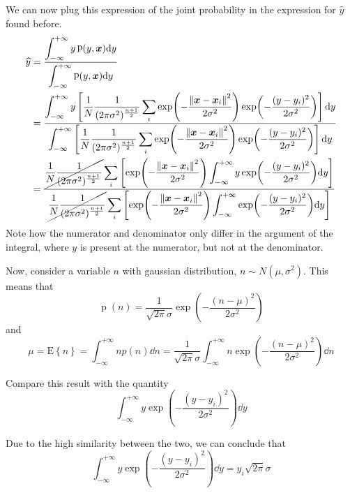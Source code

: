\documentclass[oneside,onecolumn]{report}
\newcommand{\E}[1]{\text{E} \left\{ #1 \right\}}
\DeclareMathOperator*{\pdf}{p}
\begin{document}
We can now plug this expression of the joint probability in the expression for $\widehat y$ found before.
\begin{align*}
    \widehat y
    &= \frac{\displaystyle \int_{-\infty}^{+\infty} y \pdf(y, \bm x) \dd y}{\displaystyle \int_{-\infty}^{+\infty} \pdf(y, \bm x) \dd y} \\
    &= \frac
        {\displaystyle \int_{-\infty}^{+\infty} y
            \left[
                \frac{1}{N} \frac{1}{(2 \pi \sigma^2)^{\frac{n + 1}{2}}} \sum_i \exp(- \frac{\norm{\bm x - \bm x_i}^2}{2 \sigma^2}) \exp( - \frac{(y - y_i)^2}{2 \sigma^2})
            \right]
        \dd y}
        {\displaystyle \int_{-\infty}^{+\infty}
            \left[
                \frac{1}{N} \frac{1}{(2 \pi \sigma^2)^{\frac{n + 1}{2}}} \sum_i \exp(- \frac{\norm{\bm x - \bm x_i}^2}{2 \sigma^2}) \exp( - \frac{(y - y_i)^2}{2 \sigma^2})
            \right]
        \dd y} \\
    &= \frac
        {\displaystyle
            \cancel{\frac{1}{N} \frac{1}{(2 \pi \sigma^2)^{\frac{n + 1}{2}}}} \sum_i
            \left[
                \exp(- \frac{\norm{\bm x - \bm x_i}^2}{2 \sigma^2})
                \int_{-\infty}^{+\infty} y \exp( - \frac{(y - y_i)^2}{2 \sigma^2}) \dd y
            \right]
        }
        {\displaystyle
            \cancel{\frac{1}{N} \frac{1}{(2 \pi \sigma^2)^{\frac{n + 1}{2}}}} \sum_i
            \left[
                \exp(- \frac{\norm{\bm x - \bm x_i}^2}{2 \sigma^2})
                \int_{-\infty}^{+\infty} \exp( - \frac{(y - y_i)^2}{2 \sigma^2}) \dd y
            \right]
        }
\end{align*}
Note how the numerator and denominator only differ in the argument of the integral, where $y$ is present at the numerator, but not at the denominator.

Now, consider a variable $n$ with gaussian distribution, $n \sim N(\mu, \sigma^2)$.
This means that
$$ \pdf(n) = \frac{1}{\sqrt{2 \pi} \sigma} \exp(- \frac{(n - \mu)^2}{2 \sigma^2}) $$
and
$$ \mu = \E{n} = \int_{-\infty}^{+\infty} n p(n) \dd n = \frac{1}{\sqrt{2 \pi} \sigma} \int_{-\infty}^{+\infty} n \exp(- \frac{(n - \mu)^2}{2 \sigma^2}) \dd n $$

Compare this result with the quantity
$$ \int_{-\infty}^{+\infty} y \exp( - \frac{(y - y_i)^2}{2 \sigma^2}) \dd y $$

Due to the high similarity between the two, we can conclude that
$$ \int_{-\infty}^{+\infty} y \exp( - \frac{(y - y_i)^2}{2 \sigma^2}) \dd y = y_i \sqrt{2 \pi} \sigma $$
\end{document}
